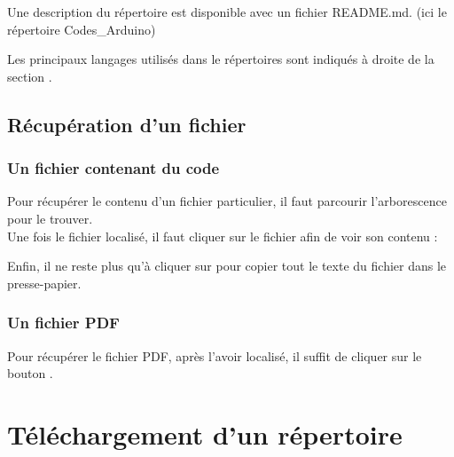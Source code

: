 
Une description du répertoire est disponible avec un fichier README.md. (ici le répertoire Codes\_Arduino)


Les principaux langages utilisés dans le répertoires sont indiqués à droite de la section .

\subsection{Récupération d'un fichier}

\subsubsection{Un fichier contenant du code}
Pour récupérer le contenu  d'un fichier particulier, il faut parcourir l'arborescence pour le trouver.\\
Une fois le fichier localisé, il faut cliquer sur le fichier afin de voir son contenu : 



Enfin, il ne reste plus qu'à cliquer sur 
pour copier tout le texte du fichier dans le presse-papier.



\subsubsection{Un fichier PDF}

Pour récupérer le fichier PDF, après l'avoir localisé, il suffit de cliquer sur le bouton .




\section{Téléchargement d'un répertoire}

